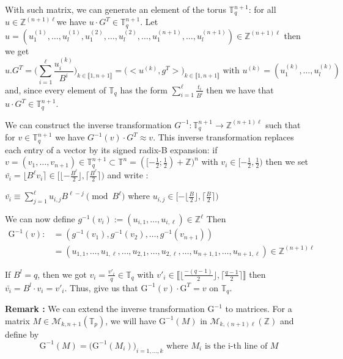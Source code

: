 \documentclass{article}
\newcommand{\Z}{\mathbb{Z}}
\newcommand{\T}{\mathbb{T}}
\newcommand{\round}[1]{\lfloor#1\rceil}
\theoremstyle{definition}
\theoremstyle{Theorem}
\begin{document}
With such matrix, we can generate an element of the torus $\T_q^{n+1}$: for all $u \in\Z^{(n+1)\ell}$we have $ u\cdot G^T \in \T_q^{n+1}$. Let $u=(u^{(1)}_1,\ldots,u^{(1)}_l,u^{(2)}_1,\ldots,u^{(2)}_l,\ldots,u^{(n+1)}_1,\ldots,u^{(n+1)}_l) \in \Z^{(n+1)\ell}$ then we get 
$$u.G^T = \Big(\sum_{i=1}^{\ell}\frac{u^{(k)}_i}{B^i}\Big)_{k\in\llbracket1,n+1\rrbracket} = \Big( <u^{(k)},g^T> \Big)_{k\in\llbracket1,n+1\rrbracket} \text{ with }u^{(k)}=(u^{(k)}_1,\ldots, u^{(k)}_l)$$
and, since every element of $\T_q$ has the form $\sum_{i=1}^{\ell} \frac{t_i}{B^i}$ then we have that $u\cdot G^T\in\T_q^{n+1}$.

We can construct  the inverse transformation $G^{-1} : \T_q^{n+1} \rightarrow \Z^{(n+1)\ell}$ such that for $v \in \T_q^{n+1}$  we have $G^{-1}(v)\cdot G^T \approx v$. This inverse transformation replaces each entry of a vector by its signed radix-B expansion: if $v=(v_1,\dots, v_{n+1}) \in \T_q^{n+1} \subset \T^n = ([-\frac{1}{2};\frac{1}{2}) + \Z)^n$ with $v_i \in [-\frac{1}{2}, \frac{1}{2})$ then we set $\bar{v_i} = \round{B^\ell v_i} \in [\lfloor-\frac{B^\ell}{2}\rfloor,\lceil\frac{B^\ell}{2}\rceil)$ and write :
\begin{center}
    $\bar{v_i}\equiv\sum_{j=1}^\ell u_{i,j}B^{\ell-j} \pmod{B^\ell}$ where $u_{i,j} \in [-\lfloor\frac{B}{2}\rfloor,\lceil\frac{B}{2}\rceil)$
\end{center}

We can now define $g^{-1}(v_i):=(u_{i,1}, \dots, u_{i,\ell})\in\Z^\ell$ Then
\begin{equation}
\begin{split}
\text{G}^{-1}(v) :&=(g^{-1}(v_1), g^{-1}(v_2), \dots, g^{-1}(v_{n+1})) \\
 & =(u_{1,1},\dots, u_{1,\ell}, \dots, u_{2,1},\dots, u_{2,\ell}, \dots, u_{n+1,1},\dots, u_{n+1,\ell}) \in \Z^{(n+1)\ell}
\end{split}
\end{equation}

If $B^l = q$, then we got $v_i = \frac{v'_i}{q} \in \T_q$ with $v'_i\in\llbracket \lfloor\frac{-(q-1)}{2}\rfloor,\lceil\frac{q-1}{2}\rceil\rrbracket$ then $\bar{v_i} = B^l\cdot v_i = v'_i$. Thus, give us that $\text{G}^{-1}(v)\cdot \text{G}^T = v$ on $\T_q$.

\textbf{Remark :} We can extend the inverse transformation $\text{G}^{-1}$ to matrices. For a matrix $M\in\mathcal{M}_{k,n+1}(\T_p)$, we will have $\text{G}^{-1}(M)$ in $\mathcal{M}_{k,(n+1)\ell}(\Z)$ and define by 
$$\text{G}^{-1}(M) = \Big(\text{G}^{-1}(M_i)\Big)_{i=1,\ldots,k} \text{ where } M_i \text{ is the i-th line of } M$$
\end{document}
